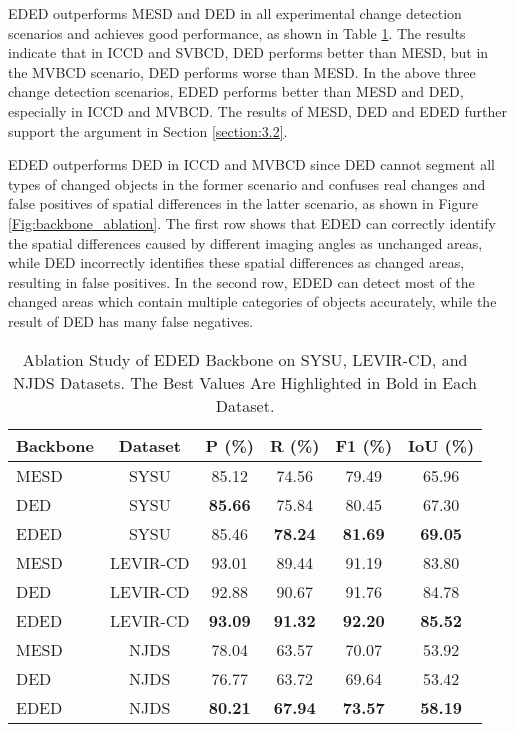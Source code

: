 \documentclass[journal]{IEEEtran}
\begin{document}
EDED outperforms MESD and DED in all experimental change detection scenarios and achieves good performance, as shown in Table \ref{backbone_ablation}. The results indicate that in ICCD and SVBCD, DED performs better than MESD, but in the MVBCD scenario, DED performs worse than MESD. In the above three change detection scenarios, EDED performs better than MESD and DED, especially in ICCD and MVBCD. The results of MESD, DED and EDED further support the argument in Section \ref{section:3.2}.

EDED outperforms DED in ICCD and MVBCD since DED cannot segment all types of changed objects in the former scenario and confuses real changes and false positives of spatial differences in the latter scenario, as shown in Figure \ref{Fig:backbone_ablation}. The first row shows that EDED can correctly identify the spatial differences caused by different imaging angles as unchanged areas, while DED incorrectly identifies these spatial differences as changed areas, resulting in false positives. In the second row, EDED can detect most of the changed areas which contain multiple categories of objects accurately, while the result of DED has many false negatives.

\begin{table}[!ht]
\caption{Ablation Study of EDED Backbone on SYSU, LEVIR-CD, and NJDS Datasets. The Best Values Are Highlighted in Bold in Each Dataset.
}
\label{backbone_ablation}
\centering
\begin{tabular}{lccccc}
\toprule
Backbone & Dataset & P (\%) & R (\%) & F1 (\%) & IoU (\%) \\
\midrule
MESD & SYSU & 85.12 & 74.56 & 79.49 & 65.96\\
DED & SYSU & \textbf{85.66} & 75.84 & 80.45 & 67.30\\
EDED & SYSU & 85.46 & \textbf{78.24} & \textbf{81.69} & \textbf{69.05}\\
\midrule
MESD & LEVIR-CD & 93.01 & 89.44 & 91.19 & 83.80\\
DED & LEVIR-CD & 92.88 & 90.67 & 91.76 & 84.78 \\
EDED & LEVIR-CD & \textbf{93.09} & \textbf{91.32} & \textbf{92.20} & \textbf{85.52}\\
\midrule
MESD & NJDS & 78.04 & 63.57 & 70.07 & 53.92\\
DED & NJDS & 76.77 & 63.72 & 69.64 & 53.42\\
EDED & NJDS & \textbf{80.21} & \textbf{67.94} & \textbf{73.57} & \textbf{58.19}\\
\bottomrule
\end{tabular}
\end{table}
\end{document}
